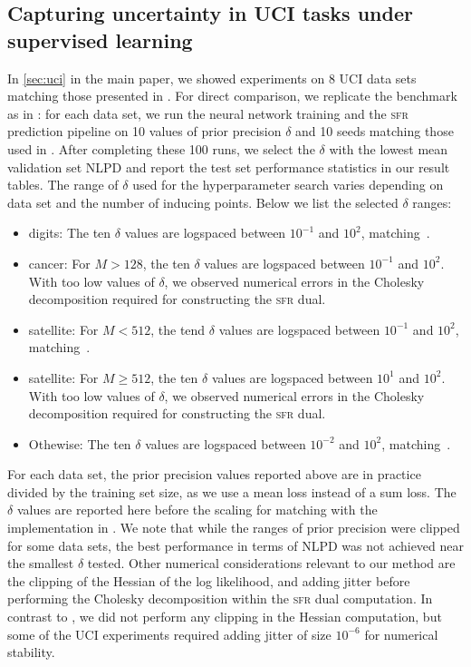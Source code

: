 \documentclass{article}
\newcommand{\our}{\textsc{sfr}\xspace}
\begin{document}
\subsection{Capturing uncertainty in UCI tasks under supervised learning}
\label{app:uci}
%
In \cref{sec:uci} in the main paper, we showed experiments on 8 UCI data sets \cite{UCI} matching those presented in \cite{immer2021improving}. For direct comparison, we replicate the benchmark as in \cite{immer2021improving}: for each data set, we run the neural network training and the \our prediction pipeline on 10 values of prior precision $\delta$ and 10 seeds matching those used in \cite{immer2021improving}. After completing these 100 runs, we select the $\delta$ with the lowest mean validation set NLPD and report the test set performance statistics in our result tables. The range of $\delta$ used for the hyperparameter search varies depending on data set and the number of inducing points. Below we list the selected $\delta$ ranges:
\begin{itemize}
\item {\sc digits}: The ten $\delta$ values are logspaced between $10^{-1}$ and $10^2$, matching~\cite{immer2021improving}.
\item {\sc cancer}: For $M > 128$, the ten $\delta$ values are logspaced between $10^{-1}$ and $10^2$. With too low values of $\delta$, we observed numerical errors in the Cholesky decomposition required for constructing the \our dual.
\item {\sc satellite}: For $M < 512$, the tend $\delta$ values are logspaced between $10^{-1}$ and $10^2$, matching~\cite{immer2021improving}.
\item {\sc satellite}: For $M \geq 512$, the ten $\delta$ values are logspaced between $10^{1}$ and $10^2$.  With too low values of $\delta$, we observed numerical errors in the Cholesky decomposition required for constructing the \our dual.
\item Othewise: The ten $\delta$ values are logspaced between $10^{-2}$ and $10^2$, matching~\cite{immer2021improving}.
\end{itemize}

For each data set, the prior precision values reported above are in practice divided by the training set size, as we use a mean loss instead of a sum loss. The $\delta$ values are reported here before the scaling for matching with the implementation in \cite{immer2021improving}.
We note that while the ranges of prior precision were clipped for some data sets, the best performance in terms of NLPD was not achieved near the smallest $\delta$ tested. Other numerical considerations relevant to our method are the clipping of the Hessian of the log likelihood, and adding jitter before performing the Cholesky decomposition within the \our dual computation. In contrast to \citet{immer2021improving}, we did not perform any clipping in the Hessian computation, but some of the UCI experiments required adding jitter of size $10^{-6}$ for numerical stability.  
\end{document}
